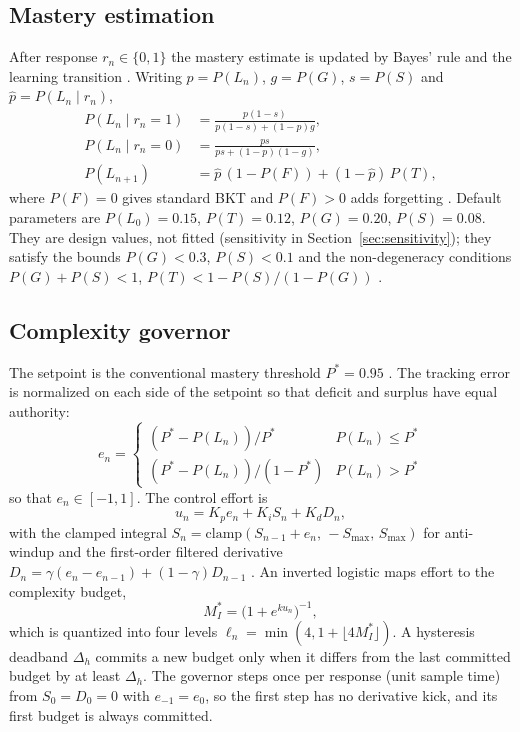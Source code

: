 \documentclass[conference]{IEEEtran}
\begin{document}
\subsection{Mastery estimation}
After response $r_n\in\{0,1\}$ the mastery estimate is updated by Bayes' rule
and the learning transition \cite{corbett1995knowledge}. Writing
$p=P(L_n)$, $g=P(G)$, $s=P(S)$ and $\hat p=P(L_n\mid r_n)$,
\begin{align}
P(L_n\mid r_n{=}1) &= \frac{p(1-s)}{p(1-s) + (1-p)g},\\
P(L_n\mid r_n{=}0) &= \frac{ps}{ps + (1-p)(1-g)},\\
P(L_{n+1}) &= \hat p\,(1-P(F)) + (1-\hat p)\,P(T),
\end{align}
where $P(F)=0$ gives standard BKT and $P(F)>0$ adds forgetting
\cite{khajah2016deep}. Default parameters are $P(L_0)=0.15$, $P(T)=0.12$,
$P(G)=0.20$, $P(S)=0.08$. They are design values, not fitted (sensitivity in Section~\ref{sec:sensitivity}); they satisfy
the bounds $P(G)<0.3$, $P(S)<0.1$ \cite{corbett1995knowledge} and the
non-degeneracy conditions $P(G)+P(S)<1$, $P(T)<1-P(S)/(1-P(G))$
\cite{vandesande2013properties}.

\subsection{Complexity governor}
The setpoint is the conventional mastery threshold $P^*=0.95$
\cite{corbett1995knowledge,zhang2025mastery}. The tracking error is normalized
on each side of the setpoint so that deficit and surplus have equal
authority:
\begin{equation}
e_n=\begin{cases}(P^*-P(L_n))/P^* & P(L_n)\le P^*\\
(P^*-P(L_n))/(1-P^*) & P(L_n)>P^*\end{cases}
\end{equation}
so that $e_n\in[-1,1]$.
The control effort is
\begin{equation}
u_n = K_p e_n + K_i S_n + K_d D_n,
\end{equation}
with the clamped integral $S_n=\mathrm{clamp}(S_{n-1}+e_n,\,-S_{\max},\,S_{\max})$
for anti-windup \cite{astrom1989windup} and the first-order filtered derivative
$D_n=\gamma(e_n-e_{n-1})+(1-\gamma)D_{n-1}$ \cite{astrom2006advanced}. An
inverted logistic maps effort to the complexity budget,
\begin{equation}
M_I^* = \bigl(1+e^{k u_n}\bigr)^{-1},
\end{equation}
which is quantized into four levels $\ell_n=\min(4,1+\lfloor 4M_I^*\rfloor)$. A
hysteresis deadband $\Delta_h$ commits a new budget only when it differs from
the last committed budget by at least $\Delta_h$. The governor steps once per
response (unit sample time) from $S_0=D_0=0$ with $e_{-1}=e_0$, so the first
step has no derivative kick, and its first budget is always committed.
\end{document}

